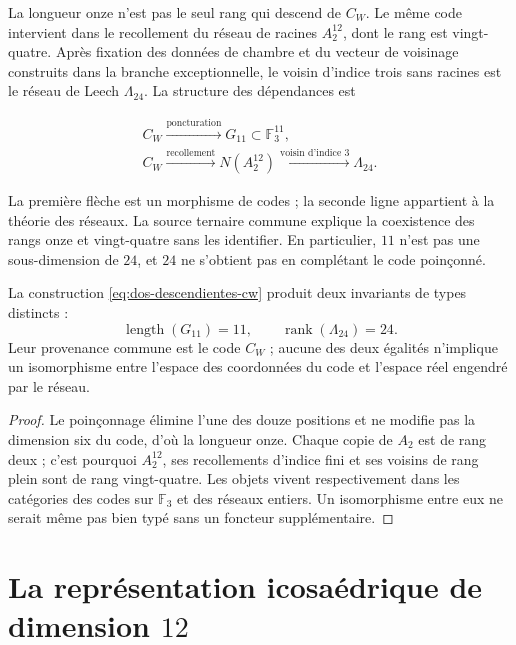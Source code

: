 La longueur onze n'est pas le seul rang qui descend de \(C_W\). Le même
code intervient dans le recollement du réseau de racines \(A_2^{12}\), dont le
rang est vingt-quatre. Après fixation des données de chambre et du vecteur de
voisinage construits dans la branche exceptionnelle, le voisin d'indice trois sans
racines est le réseau de Leech \(\Lambda_{24}\). La structure des
dépendances est

\begin{equation}
\label{eq:dos-descendientes-cw}
\begin{gathered}
C_W\xrightarrow{\text{poncturation}}G_{11}\subset\mathbb F_3^{11},\\[2mm]
C_W\xrightarrow{\text{recollement}}N(A_2^{12})
\xrightarrow{\text{voisin d'indice }3}\Lambda_{24}.
\end{gathered}
\end{equation}

La première flèche est un morphisme de codes ; la seconde ligne appartient à la
théorie des réseaux. La source ternaire commune explique la coexistence des
rangs onze et vingt-quatre sans les identifier. En particulier, \(11\) n'est pas
une sous-dimension de \(24\), et \(24\) ne s'obtient pas en complétant le code
poinçonné.

\begin{proposition}
La construction \eqref{eq:dos-descendientes-cw} produit deux invariants de
types distincts :
\[
\operatorname{length}(G_{11})=11,
\qquad
\operatorname{rank}(\Lambda_{24})=24.
\]
Leur provenance commune est le code \(C_W\) ; aucune des deux égalités
n'implique un isomorphisme entre l'espace des coordonnées du code et
l'espace réel engendré par le réseau.
\end{proposition}

\begin{proof}
Le poinçonnage élimine l'une des douze positions et ne modifie pas la dimension
six du code, d'où la longueur onze. Chaque copie de \(A_2\) est de rang
deux ; c'est pourquoi \(A_2^{12}\), ses recollements d'indice fini et ses voisins de
rang plein sont de rang vingt-quatre. Les objets vivent respectivement
dans les catégories des codes sur \(\mathbb F_3\) et des réseaux entiers. Un
isomorphisme entre eux ne serait même pas bien typé sans un foncteur
supplémentaire.
\end{proof}

\section{La représentation icosaédrique de dimension \(12\)}
\label{sec:representacion-a5-doce}

